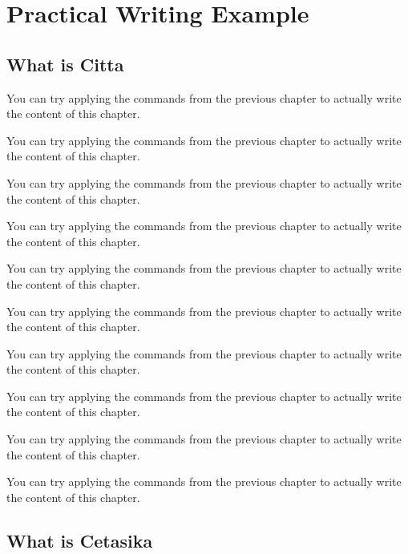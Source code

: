 \chapter{Practical Writing Example}
\starthere

\section{What is Citta}
You can try applying the commands from the previous chapter to actually write the content of this chapter.

You can try applying the commands from the previous chapter to actually write the content of this chapter.

You can try applying the commands from the previous chapter to actually write the content of this chapter.

You can try applying the commands from the previous chapter to actually write the content of this chapter.

You can try applying the commands from the previous chapter to actually write the content of this chapter.

You can try applying the commands from the previous chapter to actually write the content of this chapter.

You can try applying the commands from the previous chapter to actually write the content of this chapter.

You can try applying the commands from the previous chapter to actually write the content of this chapter.

You can try applying the commands from the previous chapter to actually write the content of this chapter.

You can try applying the commands from the previous chapter to actually write the content of this chapter.

\section{What is Cetasika}

\commentarytable%